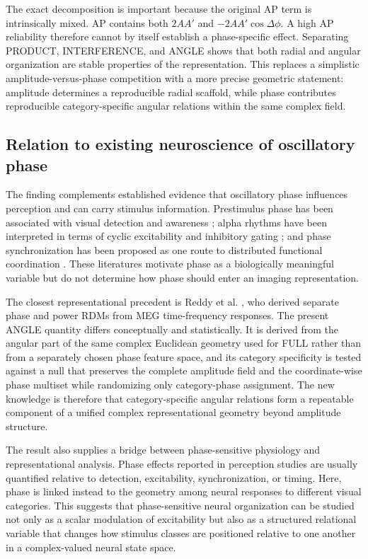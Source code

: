 \documentclass[11pt]{article}
\begin{document}
The exact decomposition is important because the original AP term is intrinsically mixed. AP contains both $2AA'$ and $-2AA'\cos\Delta\phi$. A high AP reliability therefore cannot by itself establish a phase-specific effect. Separating PRODUCT, INTERFERENCE, and ANGLE shows that both radial and angular organization are stable properties of the representation. This replaces a simplistic amplitude-versus-phase competition with a more precise geometric statement: amplitude determines a reproducible radial scaffold, while phase contributes reproducible category-specific angular relations within the same complex field.

\subsection{Relation to existing neuroscience of oscillatory phase}
The finding complements established evidence that oscillatory phase influences perception and can carry stimulus information. Prestimulus phase has been associated with visual detection and awareness \citep{Busch2009,Mathewson2009}; alpha rhythms have been interpreted in terms of cyclic excitability and inhibitory gating \citep{VanRullen2016,JensenMazaheri2010}; and phase synchronization has been proposed as one route to distributed functional coordination \citep{Palva2018}. These literatures motivate phase as a biologically meaningful variable but do not determine how phase should enter an imaging representation.

The closest representational precedent is Reddy et al. \citep{Reddy2021}, who derived separate phase and power RDMs from MEG time-frequency responses. The present ANGLE quantity differs conceptually and statistically. It is derived from the angular part of the same complex Euclidean geometry used for FULL rather than from a separately chosen phase feature space, and its category specificity is tested against a null that preserves the complete amplitude field and the coordinate-wise phase multiset while randomizing only category-phase assignment. The new knowledge is therefore that category-specific angular relations form a repeatable component of a unified complex representational geometry beyond amplitude structure.

The result also supplies a bridge between phase-sensitive physiology and representational analysis. Phase effects reported in perception studies are usually quantified relative to detection, excitability, synchronization, or timing. Here, phase is linked instead to the geometry among neural responses to different visual categories. This suggests that phase-sensitive neural organization can be studied not only as a scalar modulation of excitability but also as a structured relational variable that changes how stimulus classes are positioned relative to one another in a complex-valued neural state space.
\end{document}
